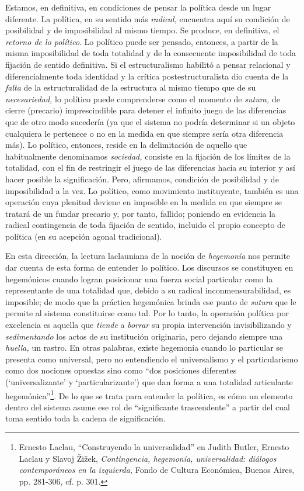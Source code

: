 Estamos, en definitiva, en condiciones de pensar la política desde un lugar diferente. La política, en su sentido más \emph{radical,} encuentra aquí su condición de posibilidad y de imposibilidad al mismo tiempo. Se produce, en definitiva, el \emph{retorno de lo político}. Lo político puede ser pensado, entonces, a partir de la misma imposibilidad de toda totalidad y de la consecuente imposibilidad de toda fijación de sentido definitiva. Si el estructuralismo habilitó a pensar relacional y diferencialmente toda identidad y la crítica postestructuralista dio cuenta de la \emph{falta} de la estructuralidad de la estructura al mismo tiempo que de su \emph{necesariedad,} lo político puede comprenderse como el momento de \emph{sutura,} de cierre (precario) imprescindible para detener el infinito juego de las diferencias que de otro modo sucedería (ya que el sistema no podría determinar si un objeto cualquiera le pertenece o no en la medida en que siempre sería otra diferencia más). Lo político, entonces, reside en la delimitación de aquello que habitualmente denominamos \emph{sociedad,} consiste en la fijación de los límites de la totalidad, con el fin de restringir el juego de las diferencias hacia su interior y así hacer posible la significación. Pero, afirmamos, condición de posibilidad y de imposibilidad a la vez. Lo político, como movimiento instituyente, también es una operación cuya plenitud deviene en imposible en la medida en que siempre se tratará de un fundar precario y, por tanto, fallido; poniendo en evidencia la radical contingencia de toda fijación de sentido, incluido el propio concepto de política (en su acepción agonal tradicional).

En esta dirección, la lectura laclauniana de la noción de \emph{hegemonía} nos permite dar cuenta de esta forma de entender lo político. Los discursos se constituyen en hegemónicos cuando logran posicionar una fuerza social particular como la representante de una totalidad que, debido a su radical inconmensurabilidad, es imposible; de modo que la práctica hegemónica brinda ese punto de \emph{sutura} que le permite al sistema constituirse como tal. Por lo tanto, la operación política por excelencia es aquella que \emph{tiende} a \emph{borrar} su propia intervención invisibilizando y \emph{sedimentando} los actos de su institución originaria, pero dejando siempre una \emph{huella,} un rastro. En otras palabras, existe hegemonía cuando lo particular se presenta como universal, pero no entendiendo el universalismo y el particularismo como dos nociones opuestas sino como \enquote{dos posiciones diferentes (\enquote{universalizante} y \enquote{particularizante}) que dan forma a una totalidad articulante hegemónica}\footnote{Ernesto Laclau, \enquote{Construyendo la universalidad} en Judith Butler, Ernesto Laclau y Slavoj Žižek, \emph{Contingencia, hegemonía, universalidad: diálogos contemporáneos en la izquierda,} Fondo de Cultura Económica, Buenos Aires, pp. 281-306, cf. p. 301.}. De lo que se trata para entender la política, es cómo un elemento dentro del sistema asume ese rol de \enquote{significante trascendente}  a partir del cual toma sentido toda la cadena de significación.

